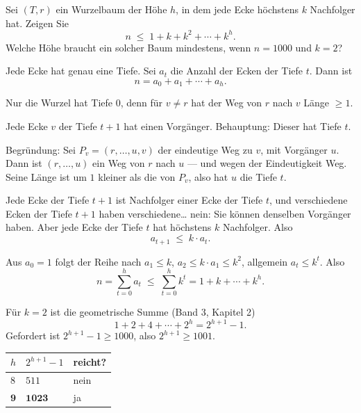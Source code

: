 \begin{aufgabe}
Sei $(T,r)$ ein Wurzelbaum der Höhe $h$, in dem jede Ecke höchstens $k$ Nachfolger hat. Zeigen Sie
\[ n \;\le\; 1 + k + k^2 + \cdots + k^h . \]
Welche Höhe braucht ein solcher Baum mindestens, wenn $n = 1000$ und $k = 2$?

\loesung
{}
Jede Ecke hat genau eine Tiefe. Sei $a_t$ die Anzahl der Ecken der Tiefe $t$. Dann ist
\[ n = a_0 + a_1 + \cdots + a_h . \]

Nur die Wurzel hat Tiefe $0$, denn für $v \neq r$ hat der Weg von $r$ nach $v$ Länge $\ge 1$.

Jede Ecke $v$ der Tiefe $t+1$ hat einen Vorgänger. Behauptung: Dieser hat Tiefe $t$.

Begründung: Sei $P_v = (r, \ldots, u, v)$ der eindeutige Weg zu $v$, mit Vorgänger $u$. Dann ist $(r, \ldots, u)$ ein Weg von $r$ nach $u$ --- und wegen der Eindeutigkeit  Weg. Seine Länge ist um $1$ kleiner als die von $P_v$, also hat $u$ die Tiefe $t$.

Jede Ecke der Tiefe $t+1$ ist Nachfolger einer Ecke der Tiefe $t$, und verschiedene Ecken der Tiefe $t+1$ haben verschiedene\ldots{} nein: Sie können denselben Vorgänger haben. Aber jede Ecke der Tiefe $t$ hat höchstens $k$ Nachfolger. Also
\[ a_{t+1} \;\le\; k \cdot a_t . \]

Aus $a_0 = 1$ folgt der Reihe nach $a_1 \le k$, $a_2 \le k \cdot a_1 \le k^2$, allgemein $a_t \le k^t$. Also
\[ n = \sum_{t=0}^{h} a_t \;\le\; \sum_{t=0}^{h} k^t = 1 + k + \cdots + k^h . \]

Für $k = 2$ ist die geometrische Summe (Band 3, Kapitel 2)
\[ 1 + 2 + 4 + \cdots + 2^h = 2^{h+1} - 1 . \]
Gefordert ist $2^{h+1} - 1 \ge 1000$, also $2^{h+1} \ge 1001$.

\begin{center}
\renewcommand{\arraystretch}{1.4}
\begin{tabular}{@{}P{1.6cm}P{2.4cm}P{2.6cm}@{}}
\toprule
$h$ & $2^{h+1}-1$ & \textbf{reicht?}\\
\midrule
$8$ & $511$ & nein\\
$\mathbf{9}$ & $\mathbf{1023}$ & \textcolor{gruen}{ja}\\
\bottomrule
\end{tabular}
\end{center}


\end{aufgabe}
